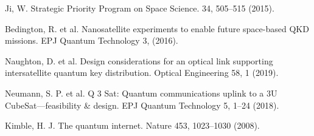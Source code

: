 \begin{thebibliography}{99}
  Ji,
  W. Strategic Priority Program on Space Science. 34,
  505–515 (2015).

  Bedington,
  R. et al. Nanosatellite experiments to enable future space-based QKD missions. EPJ Quantum Technology 3,
  (2016).

  Naughton,
  D. et al. Design considerations for an optical link supporting intersatellite quantum key distribution. Optical Engineering 58,
  1 (2019).

  Neumann,
  S. P. et al. Q 3 Sat: Quantum communications uplink to a 3U CubeSat—feasibility \& design. EPJ Quantum Technology 5,
  1–24 (2018).

  Kimble,
  H. J. The quantum internet. Nature 453,
  1023–1030 (2008).




\end{thebibliography}

